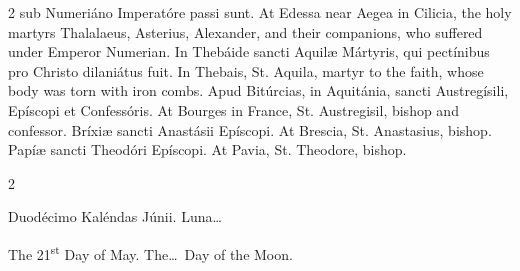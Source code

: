 \begin{paracol}{2}
 sub Numeriáno Imperatóre passi sunt.
\switchcolumn
{}
At Edessa near Aegea in Cilicia, 
 the holy martyrs Thalalaeus, Asterius, Alexander, and their companions, who 
 suffered under Emperor Numerian.
\switchcolumn*
{}
In Thebáide sancti 
 Aquilæ Mártyris, qui pectínibus pro Christo dilaniátus fuit.
\switchcolumn
{}
In Thebais, St. Aquila, martyr to 
 the faith, whose body was torn with iron combs.
\switchcolumn*
{}
Apud Bitúrcias, in 
 Aquitánia, sancti Austregísili, Epíscopi et Confessóris.
\switchcolumn
{}
At Bourges in France, St. 
 Austregisil, bishop and confessor.
\switchcolumn*
{}
Bríxiæ sancti 
 Anastásii Epíscopi.
\switchcolumn
{}
At Brescia, St. Anastasius, bishop.
\switchcolumn*
{}
Papíæ sancti Theodóri 
 Epíscopi.
\switchcolumn
{}
At Pavia, St. Theodore, bishop.
\switchcolumn*
{}
\end{paracol}


\begin{paracol}{2}
\begin{center}{\color{gregoriocolor} Duodécimo Kaléndas Júnii. 
 Luna\dots\ }\end{center}
\switchcolumn
{}
\begin{center}{\color{gregoriocolor} The 
 21\textsuperscript{st} Day of May. The\dots\ Day of the Moon.}\end{center}
\end{paracol}

